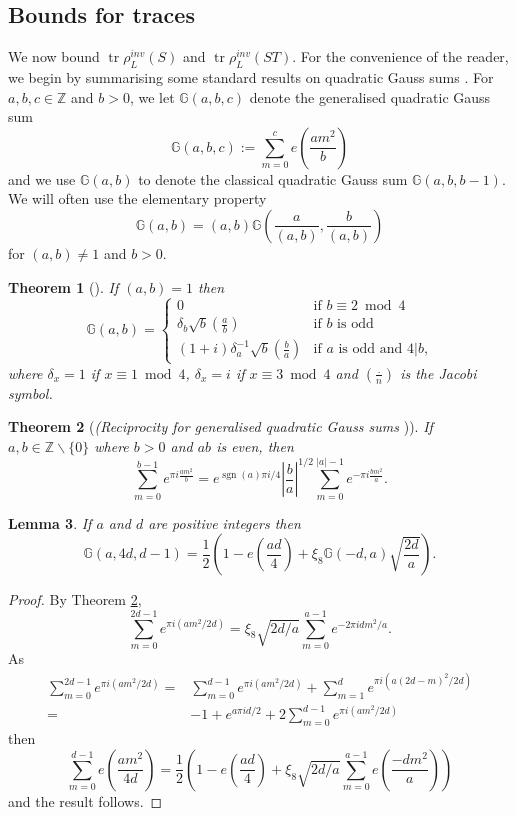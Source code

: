 \documentclass[12pt, a4paper]{article}
\newtheorem{thm}{Theorem}[section]
\newtheorem{lemma}[thm]{Lemma}
\newcommand{\GG}{\mathbb{G}}
\newcommand{\ZZ}{\mathbb{Z}}
\newcommand{\opn}{\operatorname}
\begin{document}
\subsection{Bounds for traces}
We now bound $\opn{tr}\rho_L^{inv}(S)$ and $\opn{tr}\rho_L^{inv}(ST)$.
For the convenience of the reader, we begin by summarising some standard results on quadratic Gauss sums \cite{GaussJacobiSums}. 
For $a,b,c \in \ZZ$ and $b>0$, we let $\GG(a,b,c)$ denote the generalised quadratic Gauss sum 
\[
\GG(a,b,c):=\sum_{m=0}^{c} e \left ( \frac{am^2}{b} \right )
\]
and we use $\GG(a,b)$ to denote the classical quadratic Gauss sum $\GG(a,b,b-1)$.
We will often use the elementary property 
\begin{equation}\label{NonCoprimeGaussSum} 
\GG(a,b) = (a,b) \GG \left ( \frac{a}{(a,b)}, \frac{b}{(a,b)} \right )
\end{equation}
for $(a,b) \neq 1$ and $b>0$.
\begin{thm}[{\cite{Gauss, GaussJacobiSums}}]\label{GaussSumThm}
If $(a,b)=1$ then 
\[ 
\GG(a,b) =
\begin{cases}
  0 & \text{if $b \equiv 2 \bmod{ 4}$} \\
  \delta_b \sqrt{b} \left ( \frac{a}{b} \right ) & \text{if $b$ is odd} \\
  (1+i) \delta_a^{-1} \sqrt{b} \left ( \frac{b}{a} \right ) & \text{if $a$ is odd and $4 \vert b$,}
  \end{cases}
\] 
where
$\delta_x = 1$ if $x \equiv 1 \bmod{4}$, $\delta_x=i$ if $x \equiv 3 \bmod{4}$
and $( \frac{.}{n} )$ is the Jacobi symbol.
\end{thm}
\begin{thm}[{\emph{(Reciprocity for generalised quadratic Gauss sums} \cite[Theorem 1.2.2]{GaussJacobiSums})}]\label{reciprocitythm}
If $a,b \in \ZZ \backslash \{0 \}$ where $b>0$ and $ab$ is even, then
\[ \sum_{m=0}^{b-1} e^{\pi i \frac{am^2}{b}} = e^{\opn{sgn}(a) \pi i / 4} \left \vert \frac{b}{a} \right \vert^{1/2}  \sum_{m=0}^{\vert a \vert - 1} e^{- \pi i \frac{b m^2}{a}}.
\]
\end{thm}
\begin{lemma}\label{agausssumlemma}
  If $a$ and $d$ are positive integers then 
  \[
\GG(a, 4d, d-1)
  =
  \frac{1}{2}
  \left (
  1 - e \left (\frac{a d}{4} \right ) +   \xi_8 \GG(-d, a) \sqrt{\frac{2d}{a}}  \right ).
  \]
\end{lemma}
\begin{proof}
By Theorem \ref{reciprocitythm}, 
  \[
  \sum_{m=0}^{2d - 1} e^{\pi i (a m^2/2d)} = \xi_8  \sqrt{2d/a} \sum_{m=0}^{a-1} e^{-2\pi i dm^2/a}.
  \]
  As
  \begin{align*}
    \sum_{m=0}^{2d-1} e^{\pi i (am^2/2d)}
    = & \sum_{m=0}^{d-1} e^{\pi i (am^2/2d)} + \sum_{m=1}^{d} e^{\pi i (a(2d-m)^2 / 2d)} \\
    = & -1 + e^{a \pi i d / 2} + 2  \sum_{m=0}^{d-1} e^{\pi i (am^2/2d)}
  \end{align*}
  then
  \[
  \sum_{m=0}^{d-1} e \left ( \frac{am^2}{4d} \right ) = \frac{1}{2}
  \left (
  1 - e \left (\frac{a d}{4} \right ) + \xi_8 \sqrt{2d/a} \sum_{m=0}^{a-1} e \left (\frac{-d m^2}{a} \right )
  \right )
  \]
  and the result follows.
\end{proof}
\end{document}
